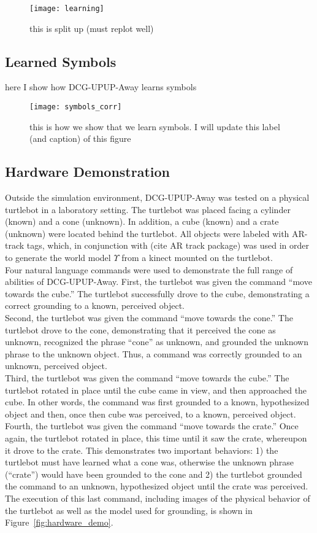 \begin{figure}[h]
\centering
\texttt{[image: learning]}
\caption{this is split up (must replot well)}
\label{fig:g_acc_split}
\end{figure}


\subsection{Learned Symbols}
here I show how DCG-UPUP-Away learns symbols
\begin{figure}[h]
\centering
\texttt{[image: symbols\_corr]}
\caption{this is how we show that we learn symbols. I will update this label (and caption) of this figure}
\label{fig:g_acc}
\end{figure}

\subsection{Hardware Demonstration}
Outside the simulation environment, DCG-UPUP-Away was tested on a physical turtlebot in a laboratory setting.
The turtlebot was placed facing a cylinder (known) and a cone (unknown).
In addition, a cube (known) and a crate (unknown) were located behind the turtlebot.
All objects were labeled with AR-track tags, which, in conjunction with (cite AR track package) was used in order to generate the world model $\Upsilon$ from a kinect mounted on the turtlebot.\\
\indent Four natural language commands were used to demonstrate the full range of abilities of DCG-UPUP-Away.
First, the turtlebot was given the command ``move towards the cube.''
The turtlebot successfully drove to the cube, demonstrating a correct grounding to a known, perceived object.\\
\indent Second, the turtlebot was given the command ``move towards the cone.''
The turtlebot drove to the cone, demonstrating that it perceived the cone as unknown, recognized the phrase ``cone'' as unknown, and grounded the unknown phrase to the unknown object.
Thus, a command was correctly grounded to an unknown, perceived object.\\
\indent Third, the turtlebot was given the command ``move towards the cube.''
The turtlebot rotated in place until the cube came in view, and then approached the cube.
In other words, the command was first grounded to a known, hypothesized object and then, once then cube was perceived, to a known, perceived object.\\
\indent Fourth, the turtlebot was given the command ``move towards the crate.''
Once again, the turtlebot rotated in place, this time until it saw the crate, whereupon it drove to the crate.
This demonstrates two important behaviors: 1) the turtlebot must have learned what a cone was, otherwise the unknown phrase (``crate'') would have been grounded to the cone and 2) the turtlebot grounded the command to an unknown, hypothesized object until the crate was perceived.
The execution of this last command, including images of the physical behavior of the turtlebot as well as the model used for grounding, is shown in Figure~\ref{fig:hardware_demo}.

